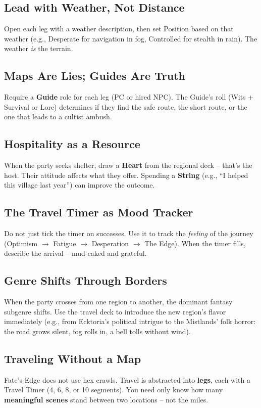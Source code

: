 \subsection{Lead with Weather, Not Distance}
Open each leg with a weather description, then set Position based on that weather (e.g., Desperate for navigation in fog, Controlled for stealth in rain). The weather \emph{is} the terrain.

\subsection{Maps Are Lies; Guides Are Truth}
Require a \textbf{Guide} role for each leg (PC or hired NPC). The Guide's roll (Wits + Survival or Lore) determines if they find the safe route, the short route, or the one that leads to a cultist ambush.

\subsection{Hospitality as a Resource}
When the party seeks shelter, draw a \textbf{Heart} from the regional deck -- that's the host. Their attitude affects what they offer. Spending a \textbf{String} (e.g., ``I helped this village last year'') can improve the outcome.

\subsection{The Travel Timer as Mood Tracker}
Do not just tick the timer on successes. Use it to track the \emph{feeling} of the journey (Optimism $\rightarrow$ Fatigue $\rightarrow$ Desperation $\rightarrow$ The Edge). When the timer fills, describe the arrival -- mud-caked and grateful.

\subsection{Genre Shifts Through Borders}
When the party crosses from one region to another, the dominant fantasy subgenre shifts. Use the travel deck to introduce the new region's flavor immediately (e.g., from Ecktoria's political intrigue to the Mistlands' folk horror: the road grows silent, fog rolls in, a bell tolls without wind).

\subsection{Traveling Without a Map}
Fate's Edge does not use hex crawls. Travel is abstracted into \textbf{legs}, each with a Travel Timer (4, 6, 8, or 10 segments). You need only know how many \textbf{meaningful scenes} stand between two locations -- not the miles.

